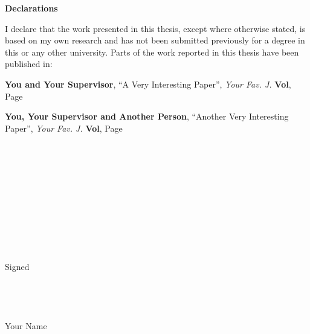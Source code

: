 \pagestyle{plain}

\begin{center}
    {\LARGE\bf Declarations}
\end{center}

I declare that the work presented in this thesis, except where otherwise stated,
is based on my own research and has not been submitted previously for a degree
in this or any other university. Parts of the work reported in this thesis have
been published in:

\begin{trivlist}
\item {\bf You and Your Supervisor}, ``A Very Interesting Paper'', \emph{Your Fav. J.} {\bf Vol}, Page
\item {\bf You, Your Supervisor and Another Person}, ``Another Very Interesting Paper'', \emph{Your Fav. J.} {\bf Vol}, Page
\end{trivlist}
\ \\ \ \\ \ \\ \ \\ \ \\ \ \\ \ \\ \ \\ \ \\ \ \\ 
Signed
\\ \ \\ \ \\ \ \\ \ \\ 
Your Name

\newpage
